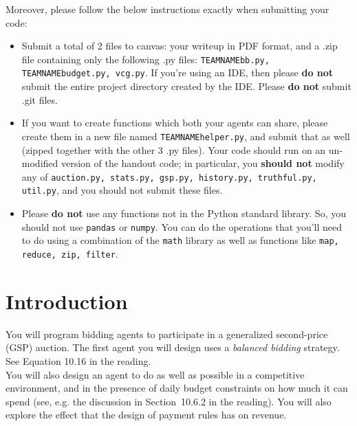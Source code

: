\documentclass[11pt]{article}
\begin{document}
Moreover, please follow the below instructions exactly when submitting your code:
\begin{itemize}
\item Submit a total of 2 files to canvas: your writeup in PDF format, and a .zip file containing only the following .py files: \texttt{TEAMNAMEbb.py, TEAMNAMEbudget.py, vcg.py}. If you're using an IDE, then please {\bf do not} submit the entire project directory created by the IDE. Please {\bf do not} submit .git files.
\item If you want to create functions which both your agents can share, please create them in a new file named \texttt{TEAMNAMEhelper.py}, and submit that as well (zipped together with the other 3 .py files). Your code should run on an un-modified version of the handout code; in particular, you {\bf should not} modify any of \texttt{auction.py, stats.py, gsp.py, history.py, truthful.py, util.py}, and you should not submit these files.
\item Please {\bf do not} use any functions not in the Python standard library. So, you should not use \texttt{pandas} or \texttt{numpy}. You can do the operations that you'll need to do using a combination of the \texttt{math} library as well as functions like \texttt{map, reduce, zip, filter}.
\end{itemize}

\section{Introduction}

You will program bidding agents to participate in a generalized
second-price (GSP) auction.  The first agent you will design uses a
{\em balanced bidding} strategy. See Equation 10.16 in the reading.  \\


You will also design an agent to do as well as possible
in a competitive environment, and in the presence of daily budget
constraints on how much it can spend (see, e.g. the discussion in
Section~10.6.2 in the reading).  You will also explore the effect that
the design of payment rules has on revenue.
\end{document}
